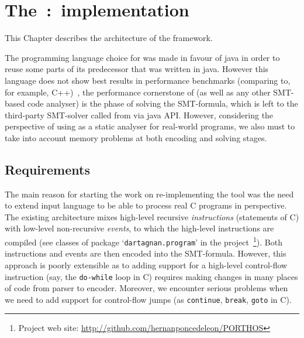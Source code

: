 \chapter{\nohyphens{The~\porthos[2]:~implementation}}
\label{ch:impl}



This Chapter describes the architecture of the \porthos[2] framework.

The programming language choice for \porthos[2] was made in favour of java in order to reuse some parts of its predecessor \porthos that was written in java. However this language does not show best results in performance benchmarks (comparing to, for example, C++)~\cite{TODO}, the performance cornerstone of \porthos[2] (as well as any other SMT-based code analyser) is the phase of solving the SMT-formula, which is left to the third-party SMT-solver called from \porthos[2] via java API. However, considering the perspective of using \porthos[2] as a static analyser for real-world programs, we also must to take into account memory problems at both encoding and solving stages.

\section{Requirements}
\label{ch:impl:requirements}

The main reason for starting the work on re-implementing the \porthos tool was the need to extend input language to be able to process real C programs in perspective. The existing \porthos architecture mixes high-level recursive \textit{instructions} (statements of C) with low-level non-recursive \textit{events}, to which the high-level instructions are compiled (see classes of package `\texttt{dartagnan.program}' in the \porthos project~\footnote{Project web site: \url{http://github.com/hernanponcedeleon/PORTHOS}}). Both instructions and events are then encoded into the SMT-formula. However, this approach is poorly extensible as to adding support for a high-level control-flow instruction (say, the \texttt{do-while} loop in C) requires making changes in many places of code from parser to encoder. Moreover, we encounter serious problems when we need to add support for control-flow jumps (as \texttt{continue}, \texttt{break}, \texttt{goto} in C).

